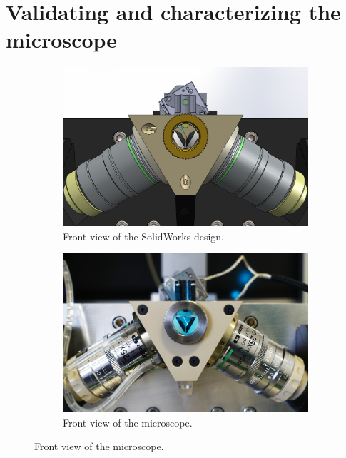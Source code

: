
\section{Validating and characterizing the microscope}
  \begin{figure}
    \begin{subfigure}[t]{0.5\textwidth}
      \centering
      \includegraphics[width=\textwidth]{photos/front_solidworks_overlay}
      \caption{Front view of the SolidWorks design.}
    \end{subfigure}
    \begin{subfigure}[t]{0.5\textwidth}
      \centering
      \includegraphics[width=\textwidth]{photos/front_photo_overlay.jpg}
      \caption{Front view of the microscope.}

\end{subfigure}
\end{figure}
